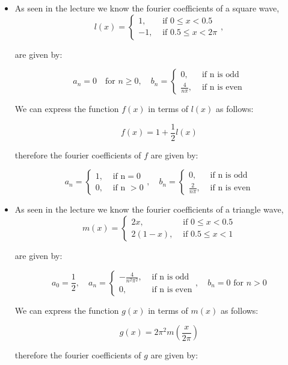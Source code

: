 \documentclass[11pt]{article}
\begin{document}
\begin{solution}     
\begin{itemize}
\item As seen in the lecture we know the fourier coefficients of a square wave,
 $$
l(x)= \begin{cases}1, & \text { if } 0 \leq x<0.5 \\ -1, & \text { if } 0.5 \leq x<2 \pi\end{cases},
$$

are given by:

$$
a_n = 0\quad \text{for } n \geq 0, \quad b_n = \begin{cases}0, & \text { if n is odd} \\ \frac{4}{n\pi}, & \text{ if n is even}\end{cases}
$$

We can express the function $f(x)$ in terms of $l(x)$ as follows:

$$
f(x) = 1 + \frac{1}{2}l(x)
$$

therefore the fourier coefficients of $f$ are given by:

$$
a_n = \begin{cases}1, & \text { if n} = 0 \\0,& \text{ if n }>0\end{cases}, \quad b_n = \begin{cases}0, & \text { if n is odd} \\ \frac{2}{n\pi}, & \text{ if n is even}\end{cases}
$$
\item  As seen in the lecture we know the fourier coefficients of a triangle wave,
$$
m(x)= \begin{cases}2 x, & \text { if } 0 \leq x<0.5 \\ 2(1-x), & \text { if } 0.5 \leq x<1\end{cases}
$$

are given by:

$$
a_0 = \frac{1}{2}, \quad a_n = \begin{cases}-\frac{4}{n^2\pi^2}, & \text { if n is odd} \\ 0, & \text{ if n is even}\end{cases}, \quad b_n = 0 \text{ for } n > 0
$$

We can express the function $g(x)$ in terms of $m(x)$ as follows:

$$
g(x) = 2\pi^2 m(\frac{x}{2\pi})
$$

therefore the fourier coefficients of $g$ are given by:


\end{itemize}
\end{solution}
\end{document}
